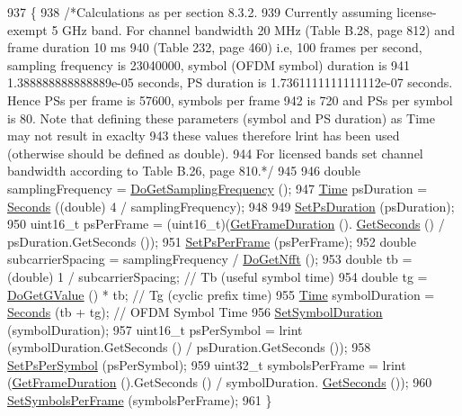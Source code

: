 \begin{DoxyCode}
937 \{
938   \textcolor{comment}{/*Calculations as per section 8.3.2.}
939 \textcolor{comment}{   Currently assuming license-exempt 5 GHz band. For channel bandwidth 20 MHz (Table B.28, page 812) and
       frame duration 10 ms}
940 \textcolor{comment}{   (Table 232, page 460) i.e, 100 frames per second, sampling frequency is 23040000, symbol (OFDM symbol)
       duration is}
941 \textcolor{comment}{   1.388888888888889e-05 seconds, PS duration is 1.7361111111111112e-07 seconds. Hence PSs per frame is
       57600, symbols per frame}
942 \textcolor{comment}{   is 720 and PSs per symbol is 80. Note that defining these parameters (symbol and PS duration) as Time
       may not result in exaclty}
943 \textcolor{comment}{   these values therefore lrint has been used (otherwise should be defined as double).}
944 \textcolor{comment}{   For licensed bands set channel bandwidth according to Table B.26, page 810.*/}
945 
946   \textcolor{keywordtype}{double} samplingFrequency = \hyperlink{classns3_1_1SimpleOfdmWimaxPhy_ae46709f574722631f43e685984017e95}{DoGetSamplingFrequency} ();
947   \hyperlink{namespacens3_1_1TracedValueCallback_a7ffd3e7c142ffe7c8a1d2db9b8de38ec}{Time} psDuration = \hyperlink{group__timecivil_ga33c34b816f8ff6628e33d5c8e9713b9e}{Seconds} ((\textcolor{keywordtype}{double}) 4 / samplingFrequency);
948 
949   \hyperlink{classns3_1_1WimaxPhy_ab1103778368ee99aaa33d7b9e8e8d348}{SetPsDuration} (psDuration);
950   uint16\_t psPerFrame = (uint16\_t)(\hyperlink{classns3_1_1WimaxPhy_a1eb798d21c180dee88590ca66f48c407}{GetFrameDuration} ().
      \hyperlink{classns3_1_1Time_a8f20d5c3b0902d7b4320982f340b57c8}{GetSeconds} () / psDuration.GetSeconds ());
951   \hyperlink{classns3_1_1WimaxPhy_a9cb0c394645ada1b5088cf50bed7d481}{SetPsPerFrame} (psPerFrame);
952   \textcolor{keywordtype}{double} subcarrierSpacing = samplingFrequency / \hyperlink{classns3_1_1SimpleOfdmWimaxPhy_afbd37bfeff3d01d21c67965cb645e152}{DoGetNfft} ();
953   \textcolor{keywordtype}{double} tb = (double) 1 / subcarrierSpacing; \textcolor{comment}{// Tb (useful symbol time)}
954   \textcolor{keywordtype}{double} tg = \hyperlink{classns3_1_1SimpleOfdmWimaxPhy_aadef9c3fe049f03d4a51ce14f3afadd7}{DoGetGValue} () * tb; \textcolor{comment}{// Tg (cyclic prefix time)}
955   \hyperlink{namespacens3_1_1TracedValueCallback_a7ffd3e7c142ffe7c8a1d2db9b8de38ec}{Time} symbolDuration = \hyperlink{group__timecivil_ga33c34b816f8ff6628e33d5c8e9713b9e}{Seconds} (tb + tg); \textcolor{comment}{// OFDM Symbol Time}
956   \hyperlink{classns3_1_1WimaxPhy_a0f5d383f628aba44ed30d1cc2d9bb02f}{SetSymbolDuration} (symbolDuration);
957   uint16\_t psPerSymbol = lrint (symbolDuration.GetSeconds () / psDuration.GetSeconds ());
958   \hyperlink{classns3_1_1WimaxPhy_ae1146cc81e9ee394e5ca24a2b98dc731}{SetPsPerSymbol} (psPerSymbol);
959   uint32\_t symbolsPerFrame = lrint (\hyperlink{classns3_1_1WimaxPhy_a1eb798d21c180dee88590ca66f48c407}{GetFrameDuration} ().GetSeconds () / symbolDuration.
      \hyperlink{classns3_1_1Time_a8f20d5c3b0902d7b4320982f340b57c8}{GetSeconds} ());
960   \hyperlink{classns3_1_1WimaxPhy_a6a87ab2655e031f93c22c68d7a2f6337}{SetSymbolsPerFrame} (symbolsPerFrame);
961 \}
\end{DoxyCode}


